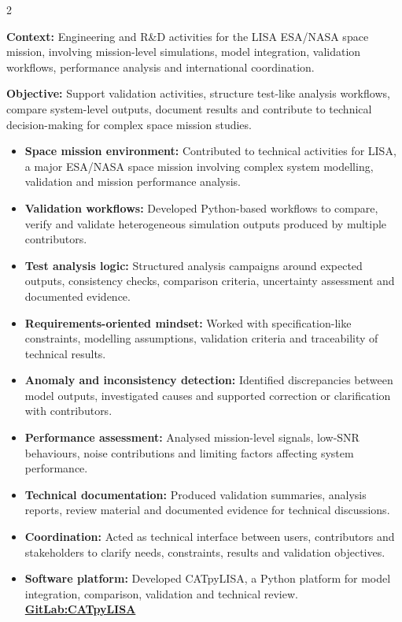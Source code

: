 \documentclass[8pt,a4paper,ragged2e,withhyper]{altacv}
\begin{document}
\begin{paracol}{2}
\divider


\textbf{Context:} Engineering and R\&D activities for the LISA ESA/NASA space mission, involving mission-level simulations, model integration, validation workflows, performance analysis and international coordination.

\textbf{Objective:} Support validation activities, structure test-like analysis workflows, compare system-level outputs, document results and contribute to technical decision-making for complex space mission studies.

\begin{itemize}
  \item \textbf{Space mission environment:} Contributed to technical activities for LISA, a major ESA/NASA space mission involving complex system modelling, validation and mission performance analysis.
  \item \textbf{Validation workflows:} Developed Python-based workflows to compare, verify and validate heterogeneous simulation outputs produced by multiple contributors.
  \item \textbf{Test analysis logic:} Structured analysis campaigns around expected outputs, consistency checks, comparison criteria, uncertainty assessment and documented evidence.
  \item \textbf{Requirements-oriented mindset:} Worked with specification-like constraints, modelling assumptions, validation criteria and traceability of technical results.
  \item \textbf{Anomaly and inconsistency detection:} Identified discrepancies between model outputs, investigated causes and supported correction or clarification with contributors.
  \item \textbf{Performance assessment:} Analysed mission-level signals, low-SNR behaviours, noise contributions and limiting factors affecting system performance.
  \item \textbf{Technical documentation:} Produced validation summaries, analysis reports, review material and documented evidence for technical discussions.
  \item \textbf{Coordination:} Acted as technical interface between users, contributors and stakeholders to clarify needs, constraints, results and validation objectives.
  \item \textbf{Software platform:} Developed CATpyLISA, a Python platform for model integration, comparison, validation and technical review.
  \textcolor{DarkPastelRed}{\href{https://gitlab.oca.eu/gboileau/lisa_l3_tools}{\bf GitLab:CATpyLISA}}
\end{itemize}


\end{paracol}
\end{document}
